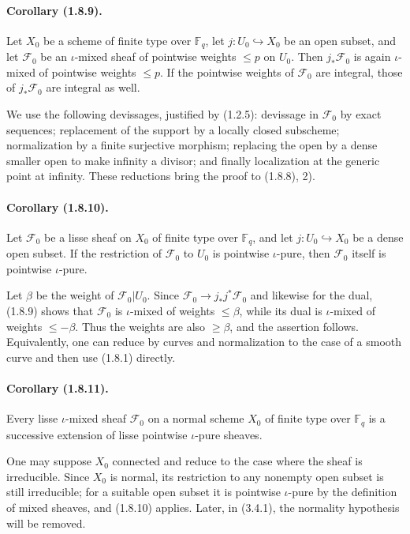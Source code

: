 \documentclass[11pt]{article}
\theoremstyle{remark}
\newcommand{\Fq}{\mathbb{F}_q}
\begin{document}
\paragraph{Corollary (1.8.9).}
Let $X_0$ be a scheme of finite type over $\Fq$, let $j:U_0\hookrightarrow X_0$ be an open subset, and let $\mathcal F_0$ be an $\iota$-mixed sheaf of pointwise weights $\le p$ on $U_0$. Then $j_{*}\mathcal F_0$ is again $\iota$-mixed of pointwise weights $\le p$. If the pointwise weights of $\mathcal F_0$ are integral, those of $j_{*}\mathcal F_0$ are integral as well.

We use the following devissages, justified by (1.2.5): devissage in $\mathcal F_0$ by exact sequences; replacement of the support by a locally closed subscheme; normalization by a finite surjective morphism; replacing the open by a dense smaller open to make infinity a divisor; and finally localization at the generic point at infinity. These reductions bring the proof to (1.8.8), 2).

\paragraph{Corollary (1.8.10).}
Let $\mathcal F_0$ be a lisse sheaf on $X_0$ of finite type over $\Fq$, and let $j:U_0\hookrightarrow X_0$ be a dense open subset. If the restriction of $\mathcal F_0$ to $U_0$ is pointwise $\iota$-pure, then $\mathcal F_0$ itself is pointwise $\iota$-pure.

Let $\beta$ be the weight of $\mathcal F_0|U_0$. Since $\mathcal F_0\to j_{*}j^*\mathcal F_0$ and likewise for the dual, (1.8.9) shows that $\mathcal F_0$ is $\iota$-mixed of weights $\le\beta$, while its dual is $\iota$-mixed of weights $\le -\beta$. Thus the weights are also $\ge\beta$, and the assertion follows. Equivalently, one can reduce by curves and normalization to the case of a smooth curve and then use (1.8.1) directly.

\paragraph{Corollary (1.8.11).}
Every lisse $\iota$-mixed sheaf $\mathcal F_0$ on a normal scheme $X_0$ of finite type over $\Fq$ is a successive extension of lisse pointwise $\iota$-pure sheaves.

One may suppose $X_0$ connected and reduce to the case where the sheaf is irreducible. Since $X_0$ is normal, its restriction to any nonempty open subset is still irreducible; for a suitable open subset it is pointwise $\iota$-pure by the definition of mixed sheaves, and (1.8.10) applies. Later, in (3.4.1), the normality hypothesis will be removed.
\end{document}
